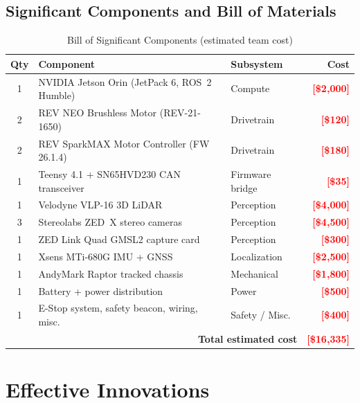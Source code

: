 \documentclass[11pt, letterpaper]{article}
\newcommand{\placeholder}[1]{\textcolor{red}{\textbf{[#1]}}}
\begin{document}
\subsection{Significant Components and Bill of Materials}

\begin{table}[H]
    \centering
    \small
    \caption{Bill of Significant Components (estimated team cost)}
    \begin{tabularx}{\textwidth}{c X l r}
        \toprule
        \textbf{Qty} & \textbf{Component} & \textbf{Subsystem} & \textbf{Cost} \\
        \midrule
        1 & NVIDIA Jetson Orin (JetPack 6, ROS~2 Humble) & Compute & \placeholder{\$2,000} \\
        2 & REV NEO Brushless Motor (REV-21-1650) & Drivetrain & \placeholder{\$120} \\
        2 & REV SparkMAX Motor Controller (FW 26.1.4) & Drivetrain & \placeholder{\$180} \\
        1 & Teensy 4.1 + SN65HVD230 CAN transceiver & Firmware bridge & \placeholder{\$35} \\
        1 & Velodyne VLP-16 3D LiDAR & Perception & \placeholder{\$4,000} \\
        3 & Stereolabs ZED~X stereo cameras & Perception & \placeholder{\$4,500} \\
        1 & ZED Link Quad GMSL2 capture card & Perception & \placeholder{\$300} \\
        1 & Xsens MTi-680G IMU + GNSS & Localization & \placeholder{\$2,500} \\
        1 & AndyMark Raptor tracked chassis & Mechanical & \placeholder{\$1,800} \\
        1 & Battery + power distribution & Power & \placeholder{\$500} \\
        1 & E-Stop system, safety beacon, wiring, misc.\ & Safety / Misc.\ & \placeholder{\$400} \\
        \midrule
        \multicolumn{3}{r}{\textbf{Total estimated cost}} & \placeholder{\$16,335} \\
        \bottomrule
    \end{tabularx}
\end{table}

\section{Effective Innovations}
\end{document}
